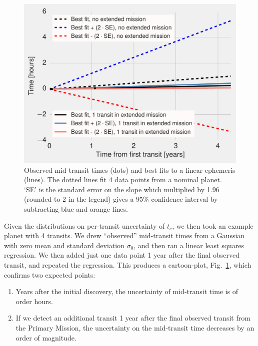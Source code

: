 \begin{figure}[!t]
	\centering
	\includegraphics[scale=1.]{figures/lowering_uncertainty_on_midtransit_via_extra_point.pdf}
	\caption{	Observed mid-transit times (dots) and best fits to a linear ephemeris (lines).
		The dotted lines fit 4 data points from a nominal planet.
		`SE' is the standard error on the slope which multiplied by 1.96 (rounded to 2 in the legend) gives a 95\% confidence interval by subtracting blue and orange lines.
	}
	\label{fig:lowering_uncertainty_tc}
\end{figure}

Given the distributions on per-transit uncertainty of $t_c$, we then took an example planet with 4 transits.
We drew ``observed'' mid-transit times from a Gaussian with zero mean and standard deviation $\sigma_{0}$, and then ran a linear least squares regression. 
We then added just one data point 1 year after the final observed transit, and repeated the regression.
This produces a cartoon-plot, Fig.~\ref{fig:lowering_uncertainty_tc}, which confirms two expected points:
\begin{enumerate}
	\item Years after the initial discovery, the uncertainty of mid-transit time is of order hours.
	\item If we detect an additional transit 1 year after the final observed transit from the Primary Mission, the uncertainty on the mid-transit time decreases by an order of magnitude.
\end{enumerate}

